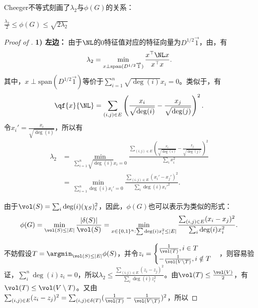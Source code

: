 \documentclass[lang=cn,newtx,10pt,scheme=chinese,chinesefont=nofont,citestyle=gb7714-2015, bibstyle=gb7714-2015]{elegantbook}
\providecommand{\rspace}[1]{\mathbb{R}^{#1}}
\providecommand{\abs}[1]{\lvert#1\rvert}
\begin{document}
\begin{refsection}
Cheeger不等式刻画了$\lambda_2$与$\phi(G)$的关系：

\begin{theorem}[Cheeger不等式]
\label{thm:cheeger}
    $\frac{\lambda_2}{2}\leq\phi(G)\leq\sqrt{2\lambda_2}$
\end{theorem}




\begin{proof}[Proof of ]
\textbf{1) 左边：}
由于$\NL$的$0$特征值对应的特征向量为$D^{1/2}\overrightarrow{1}$，由，有
\[
\lambda_2=\min_{x\perp\mathrm{span}(D^{1/2}\overrightarrow{1})}\frac{x^{\top}\NL x}{x^{\top}x}.
\]
其中，$x\perp\mathrm{span}(D^{1/2}\overrightarrow{1})$等价于$\sum_{i=1}^n\sqrt{\deg(i)}x_i=0$。类似于，有
\[
\qf{x}{\NL}=\sum_{(i,j)\in E}\left(\frac{x_i}{\sqrt{\deg(i)}}-\frac{x_j}{\sqrt{\deg(j)}}\right)^2.
\]
令$x_i'=\frac{x_i}{\sqrt{\deg(i)}}$，所以有
\begin{align*}
\lambda_2
&=\min_{\sum_{i=1}^n\sqrt{\deg(i)}x_i=0}
  \frac{\sum_{(i,j)\in E}\left(\frac{x_i}{\sqrt{\deg(i)}}-\frac{x_j}{\sqrt{\deg(j)}}\right)^2}{\sum_{i}x_i^2} \\
&=\min_{\sum_{i=1}^n\deg(i)x_i'=0}
  \frac{\sum_{(i,j)\in E}(x_i'-x_j')^2}{\sum_{i}\deg(i)x_i'^2}.
\end{align*}

由于$\vol(S)=\sum_{i}\deg(i)(\chi_S)_i^2$，因此，$\phi(G)$也可以表示为类似的形式：\[\phi(G)=\min_{\vol(S)\leq\abs{E}}\frac{\abs{\delta(S)}}{\vol(S)}=\min_{x\in\{0,1\}^n:\sum\deg(i)x_i^2\leq\abs{E}}\frac{\sum_{(i,j)\in E}(x_i-x_j)^2}{\sum_i{\deg(i)x_i^2}}.\]

不妨假设$T=\argmin_{\vol(S)\leq\abs{E}}\phi(S)$，并令$z_i=\begin{cases}
    \frac{1}{\vol(T)}, i\in T\\
    -\frac{1}{\vol(V\setminus T)}, i\notin T
\end{cases}$，则容易验证，$\sum_i^n\deg(i)z_i=0$，所以$\lambda_2\leq\frac{\sum_{(i,j)\in E}(z_i-z_j)^2}{\sum_{i}\deg(i)z_i^2}$。由$\vol(T)\leq\frac{\vol(V)}{2}$，有$\vol(T)\leq\vol(V\setminus T)$。又由$\sum_{(i,j)\in E}(z_i-z_j)^2=\sum_{(i,j)\in\delta(T)}(\frac{1}{\vol(T)}-\frac{1}{\vol(V\setminus T)})^2$，所以


\end{proof}
\end{refsection}
\end{document}
